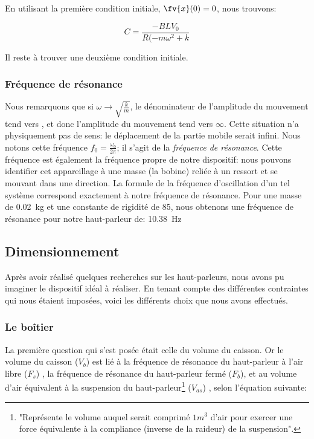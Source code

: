 En utilisant la première condition initiale, $\fv{x}(0) = 0$, nous trouvons:

$$C = \frac{-BLV_0}{R(-m\omega^2+k}$$

Il reste à trouver une deuxième condition initiale.

\subsubsection{Fréquence de résonance}
Nous remarquons que si $\omega \rightarrow \sqrt{\frac{k}{m}}$, le dénominateur de l'amplitude du mouvement
tend vers , et donc l'amplitude du mouvement tend vers $\infty$. Cette situation n'a physiquement
pas de sens: le déplacement de la partie mobile serait infini. Nous notons cette fréquence $f_0 = \frac{\omega_0}{2\pi}$; il s'agit de la \textit{fréquence de résonance}.
Cette fréquence est également la fréquence propre de notre dispositif: nous pouvons identifier cet appareillage à une masse (la bobine) reliée à un ressort et se mouvant dans une direction. La formule de la fréquence d'oscillation d'un tel système correspond exactement à notre fréquence de résonance\cite{resonance}. Pour une masse de \SI{0.02}{\kilogram} et une constante de rigidité de \SI{85}{\frac{\newton}{\meter}}, nous obtenons une fréquence de résonance pour notre haut-parleur de: \SI{10.38}{\hertz}



\subsection{Dimensionnement}
Après avoir réalisé quelques recherches sur les haut-parleurs, nous avons pu imaginer le dispositif idéal
à réaliser. En tenant compte des différentes contraintes qui nous étaient imposées, voici les différents
choix que nous avons effectués.

\subsubsection{Le boîtier}
La première question qui s'est posée était celle du volume du caisson. Or le volume du caisson ($V_b$) est
lié à la fréquence de résonance du
haut-parleur à l'air libre ($F_s$) , la fréquence de résonance du haut-parleur fermé ($F_b$), et au volume
d'air équivalent à la suspension du haut-parleur\footnote{"Représente le volume auquel serait comprimé
$1m^{3}$ d'air pour exercer une force équivalente à la compliance (inverse de la raideur) de la suspension"\cite{Vas}.}
($V_{as}$) , selon l'équation suivante\cite{Vas}:

